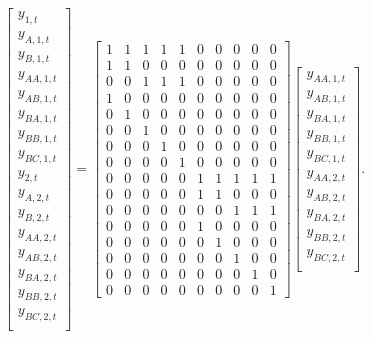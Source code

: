 \documentclass[a4paper,preprint,11pt,authoryear]{elsarticle}
\begin{document}
\begin{equation*}
  \begin{bmatrix}
    y_{1,t} \\
    y_{A,1,t} \\
    y_{B,1,t} \\
    y_{AA,1,t} \\
    y_{AB,1,t} \\
    y_{BA,1,t} \\
    y_{BB,1,t} \\
    y_{BC,1,t} \\
    y_{2,t} \\
    y_{A,2,t} \\
    y_{B,2,t} \\
    y_{AA,2,t} \\
    y_{AB,2,t} \\
    y_{BA,2,t} \\
    y_{BB,2,t} \\
    y_{BC,2,t} \\
  \end{bmatrix} =
  \begin{bmatrix}
    1 & 1 & 1 & 1 & 1 & 0 & 0 & 0 & 0 & 0 \\
    1 & 1 & 0 & 0 & 0 & 0 & 0 & 0 & 0 & 0 \\
    0 & 0 & 1 & 1 & 1 & 0 & 0 & 0 & 0 & 0 \\
    1 & 0 & 0 & 0 & 0 & 0 & 0 & 0 & 0 & 0 \\
    0 & 1 & 0 & 0 & 0 & 0 & 0 & 0 & 0 & 0 \\
    0 & 0 & 1 & 0 & 0 & 0 & 0 & 0 & 0 & 0 \\
    0 & 0 & 0 & 1 & 0 & 0 & 0 & 0 & 0 & 0 \\
    0 & 0 & 0 & 0 & 1 & 0 & 0 & 0 & 0 & 0 \\
    0 & 0 & 0 & 0 & 0 & 1 & 1 & 1 & 1 & 1 \\
    0 & 0 & 0 & 0 & 0 & 1 & 1 & 0 & 0 & 0 \\
    0 & 0 & 0 & 0 & 0 & 0 & 0 & 1 & 1 & 1 \\
    0 & 0 & 0 & 0 & 0 & 1 & 0 & 0 & 0 & 0 \\
    0 & 0 & 0 & 0 & 0 & 0 & 1 & 0 & 0 & 0 \\
    0 & 0 & 0 & 0 & 0 & 0 & 0 & 1 & 0 & 0 \\
    0 & 0 & 0 & 0 & 0 & 0 & 0 & 0 & 1 & 0 \\
    0 & 0 & 0 & 0 & 0 & 0 & 0 & 0 & 0 & 1
  \end{bmatrix}
  \begin{bmatrix}
    y_{AA,1,t} \\
    y_{AB,1,t} \\
    y_{BA,1,t} \\
    y_{BB,1,t} \\
    y_{BC,1,t} \\
    y_{AA,2,t} \\
    y_{AB,2,t} \\
    y_{BA,2,t} \\
    y_{BB,2,t} \\
    y_{BC,2,t} \\
  \end{bmatrix}.
\end{equation*}
\end{document}
